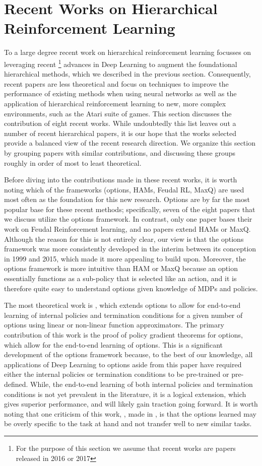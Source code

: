 \section{Recent Works on Hierarchical Reinforcement Learning}

To a large degree recent work on hierarchical reinforcement learning focusses on leveraging recent
\footnote{For the purpose of this section we assume that recent works are papers released in 2016 or 2017}
advances in Deep Learning to augment the foundational hierarchical methods, which we described in the previous section.
Consequently, recent papers are less theoretical and focus on techniques to improve the performance
of existing methods when using neural networks as well as the application of hierarchical reinforcement learning
to new, more complex environments, such as the Atari suite of games.
This section discusses the contribution of eight recent works. While undoubtedly this list leaves out a number
of recent hierarchical papers, it is our hope that the works selected provide a balanced view of the recent
research direction. We organize this section by grouping papers with similar contributions, and discussing
these groups roughly in order of most to least theoretical.

Before diving into the contributions made in these recent works, it is worth noting which of the frameworks
(options, HAMs, Feudal RL, MaxQ) are used most often as the foundation for this new research.
Options are by far the most popular base for these recent methods; specifically, seven of the eight
papers that we discuss utilize the options framework. In contrast, only one paper bases their work
on Feudal Reinforcement learning, and no papers extend HAMs or MaxQ. Although the reason for this is
not entirely clear, our view is that the options framework was more consistently developed in the interim
between its conception in 1999 and 2015, which made it more appealing to build upon. Moreover, the options
framework is more intuitive than HAM or MaxQ because an option essentially functions as a sub-policy that is
selected like an action, and it is therefore quite easy to understand options given knowledge of MDPs and policies.

The most theoretical work is \cite{Bacon}, which extends options to allow for end-to-end learning
of internal policies and termination conditions for a given number of options using
linear or non-linear function approximators. The primary contribution of this work is the proof
of policy gradient theorems for options, which allow for the end-to-end learning of options.
This is a significant development of the options framework because, to the best of our knowledge,
all applications of Deep Learning to options aside from this paper have required either the internal policies
or termination conditions to be pre-trained or pre-defined. While, the end-to-end learning of both internal policies
and termination conditions is not yet prevalent in the literature, it is a logical extension, which gives superior
performance, and will likely gain traction going forward. It is worth noting that one criticism of this work,
, made in \cite{Florensa}, is that the options learned may be overly specific to the task at hand and not transfer well
to new similar tasks.

